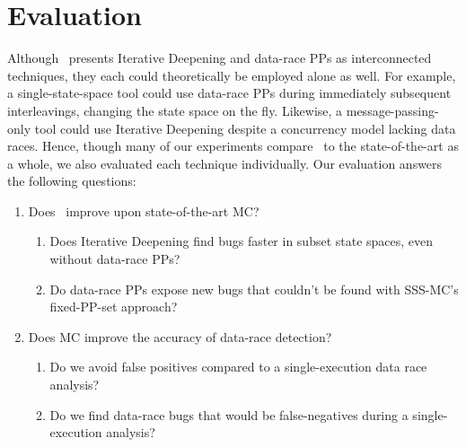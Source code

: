 \section{Evaluation}
\label{sec:eval}

Although \quicksand~presents Iterative Deepening and data-race PPs as interconnected techniques, they each could theoretically be employed alone as well. %
For example, a single-state-space tool could use data-race PPs during immediately subsequent interleavings,
changing the state space on the fly.
Likewise, a message-passing-only tool could use Iterative Deepening despite a concurrency model lacking data races. %
Hence, though many of our experiments compare \quicksand~to the state-of-the-art as a whole,
we also evaluated each technique individually.
Our evaluation answers the following questions:
\begin{enumerate}

	\item Does \quicksand~improve upon state-of-the-art MC?
		\begin{enumerate}
			\item Does Iterative Deepening find bugs faster
				in subset state spaces, even without data-race PPs?
			\item Do data-race PPs expose new bugs that couldn't be found with SSS-MC's fixed-PP-set approach?
		\end{enumerate}
	\item Does MC improve the accuracy of data-race detection?
		\begin{enumerate}
			\item Do we avoid false positives compared to a single-execution data race analysis?
			\item Do we find data-race bugs that would be false-negatives during a single-execution analysis?%
		\end{enumerate}
\end{enumerate}

